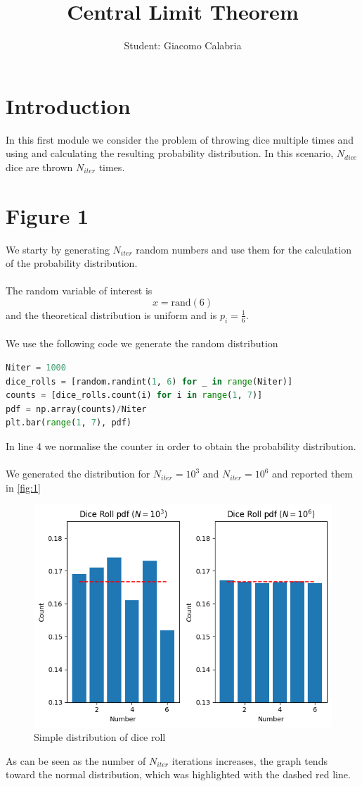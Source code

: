\documentclass{article}
\title{\textbf{Central Limit Theorem}}
\author{Student: Giacomo Calabria}
\date{}
\begin{document}
\maketitle

\section*{Introduction}
In this first module we consider the problem of throwing dice multiple times and using and calculating the resulting probability distribution. In this scenario, $N_{dice}$ dice are thrown $N_{iter}$ times.
\section{Figure 1}
We starty by generating $N_{iter}$ random numbers and use them for the calculation of the probability distribution.\\\\
The random variable of interest is
\begin{equation}
    x=\text{rand}(6)
\end{equation}
and the theoretical distribution is uniform and is $p_i=\frac16$.\\\\
We use the following code we generate the random distribution
\begin{lstlisting}[language=Python]
Niter = 1000
dice_rolls = [random.randint(1, 6) for _ in range(Niter)]
counts = [dice_rolls.count(i) for i in range(1, 7)]
pdf = np.array(counts)/Niter
plt.bar(range(1, 7), pdf)
\end{lstlisting}
In line 4 we normalise the counter in order to obtain the probability distribution.\\\\
We generated the distribution for $N_{iter}=10^3$ and $N_{iter}=10^6$ and reported them in \autoref{fig:1}
\begin{figure}[H]
    \centering
    \includegraphics[width=.7\linewidth]{images/Figure1b.png}
    \caption{Simple distribution of dice roll}
    \label{fig:1}
\end{figure}
\noindent As can be seen as the number of $N_{iter}$ iterations increases, the graph tends toward the normal distribution, which was highlighted with the dashed red line.
\clearpage
\end{document}
